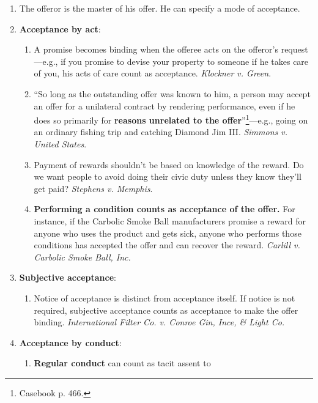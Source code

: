 \begin{enumerate}
    \item The offeror is the master of his offer. He can specify a mode of 
    acceptance.
    \item \textbf{Acceptance by act}:
    \begin{enumerate}
        \item A promise becomes binding when the offeree acts on the offeror's 
        request---e.g., if you promise to devise your property to someone if he 
        takes care of you, his acts of care count as acceptance. 
        \emph{Klockner v. Green}.
        \item ``So long as the outstanding offer was known to him, a person 
        may accept an offer for a unilateral contract by rendering 
        performance, even if he does so primarily for \textbf{reasons 
        unrelated to the offer}''\footnote{Casebook p. 466.}---e.g., going on 
        an ordinary fishing trip and catching Diamond Jim III. \emph{Simmons 
        v. United States}.
        \item Payment of rewards shouldn't be based on knowledge of the 
        reward. Do we want people to avoid doing their civic duty unless they 
        know they'll get paid? \emph{Stephens v. Memphis}.
        \item \textbf{Performing a condition counts as acceptance of the 
        offer.} For instance, if the Carbolic Smoke Ball manufacturers promise 
        a reward for anyone who uses the product and gets sick, anyone who 
        performs those conditions has accepted the offer and can recover the 
        reward. \emph{Carlill v. Carbolic Smoke Ball, Inc.}
    \end{enumerate}
    \item \textbf{Subjective acceptance}:
    \begin{enumerate}
        \item Notice of acceptance is distinct from acceptance itself. If 
        notice is not required, subjective acceptance counts as acceptance to 
        make the offer binding. \emph{International Filter Co. v. Conroe Gin, 
        Ince, \& Light Co.}
    \end{enumerate}
    \item \textbf{Acceptance by conduct}:
    \begin{enumerate}
        \item \textbf{Regular conduct} can count as tacit assent to 

\end{enumerate}
\end{enumerate}
